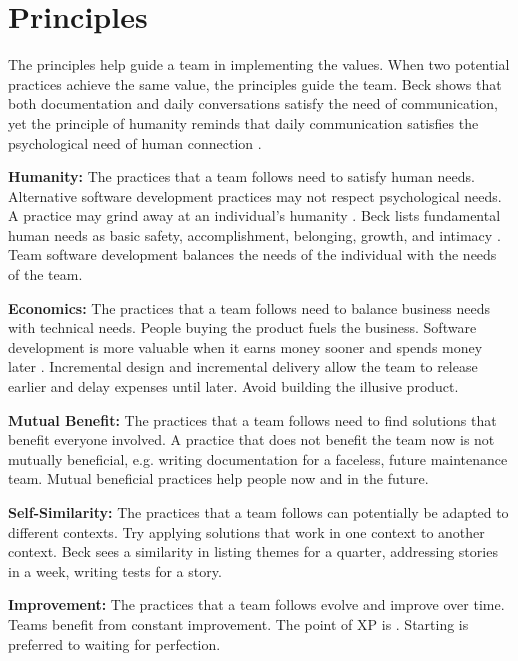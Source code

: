 \section{Principles}
The principles help guide a team in implementing the values. When two potential practices achieve the same value,  the principles guide the team. Beck shows that both documentation and daily conversations satisfy the need of communication, yet the principle of humanity reminds that daily communication satisfies the psychological need of human connection \cite{BeckExtremeProgramming2004}.


\textbf{Humanity:} The practices that a team follows need to satisfy human needs. Alternative software development practices may not respect psychological needs. A practice may grind away at an individual's humanity \cite{BeckExtremeProgramming2004}. Beck lists fundamental human needs as basic safety, accomplishment, belonging, growth, and intimacy \cite{BeckExtremeProgramming2004}. Team software development balances the needs of the individual with the needs of the team. 


\textbf{Economics:} The practices that a team follows need to balance business needs with technical needs\quotes. People buying the product fuels the business. {Software development is more valuable when it earns money sooner and spends money later} \cite{BeckExtremeProgramming2004}. Incremental design and incremental delivery allow the team to release earlier and delay expenses until later. Avoid building the illusive  product.


\textbf{Mutual Benefit:} The practices that a team follows need to find solutions that benefit everyone involved. A practice that does not benefit the team now is not mutually beneficial, e.g. writing documentation for a faceless, future maintenance team. Mutual beneficial practices help people now and in the future. 




\textbf{Self-Similarity:} The practices that a team follows can potentially be adapted to different contexts. Try applying solutions that work in one context to another context. Beck sees a similarity in listing themes for a quarter, addressing stories in a week, writing tests for a story.


\textbf{Improvement:} The practices that a team follows evolve and improve over time. Teams benefit from constant improvement. The point of XP is  \cite{BeckExtremeProgramming2004}. Starting is preferred to waiting for perfection. 


